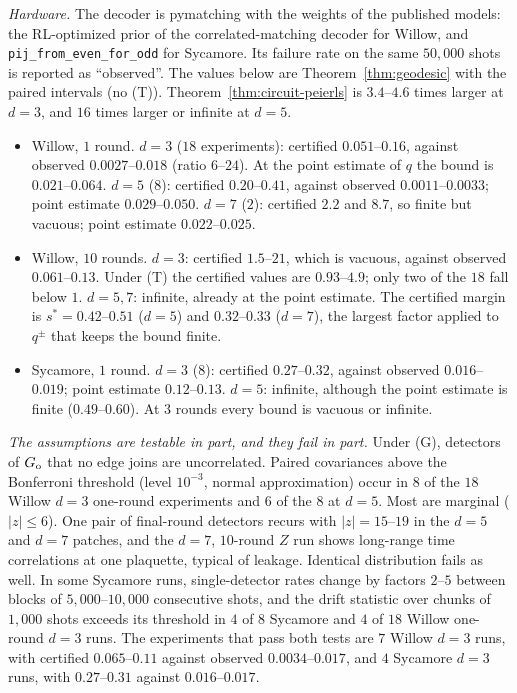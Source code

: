 \noindent\emph{Hardware.} The decoder is pymatching with the weights of the published models: the RL-optimized prior of the correlated-matching decoder for Willow, and \texttt{pij\_from\_even\_for\_odd} for Sycamore. Its failure rate on the same $50{,}000$ shots is reported as ``observed''. The values below are Theorem~\ref{thm:geodesic} with the paired intervals (no (T)). Theorem~\ref{thm:circuit-peierls} is $3.4$--$4.6$ times larger at $d=3$, and $16$ times larger or infinite at $d=5$.
\begin{itemize}
\item Willow, $1$ round. $d=3$ ($18$ experiments): certified $0.051$--$0.16$, against observed $0.0027$--$0.018$ (ratio $6$--$24$). At the point estimate of $q$ the bound is $0.021$--$0.064$. $d=5$ ($8$): certified $0.20$--$0.41$, against observed $0.0011$--$0.0033$; point estimate $0.029$--$0.050$. $d=7$ ($2$): certified $2.2$ and $8.7$, so finite but vacuous; point estimate $0.022$--$0.025$.
\item Willow, $10$ rounds. $d=3$: certified $1.5$--$21$, which is vacuous, against observed $0.061$--$0.13$. Under (T) the certified values are $0.93$--$4.9$; only two of the $18$ fall below $1$. $d=5,7$: infinite, already at the point estimate. The certified margin is $s^\ast=0.42$--$0.51$ ($d=5$) and $0.32$--$0.33$ ($d=7$), the largest factor applied to $q^\pm$ that keeps the bound finite.
\item Sycamore, $1$ round. $d=3$ ($8$): certified $0.27$--$0.32$, against observed $0.016$--$0.019$; point estimate $0.12$--$0.13$. $d=5$: infinite, although the point estimate is finite ($0.49$--$0.60$). At $3$ rounds every bound is vacuous or infinite.
\end{itemize}
\emph{The assumptions are testable in part, and they fail in part.} Under (G), detectors of $G_{\rm o}$ that no edge joins are uncorrelated. Paired covariances above the Bonferroni threshold (level $10^{-3}$, normal approximation) occur in $8$ of the $18$ Willow $d=3$ one-round experiments and $6$ of the $8$ at $d=5$. Most are marginal ($|z|\le6$). One pair of final-round detectors recurs with $|z|=15$--$19$ in the $d=5$ and $d=7$ patches, and the $d=7$, $10$-round $Z$ run shows long-range time correlations at one plaquette, typical of leakage. Identical distribution fails as well. In some Sycamore runs, single-detector rates change by factors $2$--$5$ between blocks of $5{,}000$--$10{,}000$ consecutive shots, and the drift statistic over chunks of $1{,}000$ shots exceeds its threshold in $4$ of $8$ Sycamore and $4$ of $18$ Willow one-round $d=3$ runs. The experiments that pass both tests are $7$ Willow $d=3$ runs, with certified $0.065$--$0.11$ against observed $0.0034$--$0.017$, and $4$ Sycamore $d=3$ runs, with $0.27$--$0.31$ against $0.016$--$0.017$.

